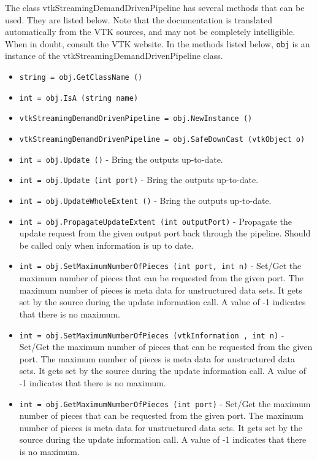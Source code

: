 The class vtkStreamingDemandDrivenPipeline has several methods that can be used.
  They are listed below.
Note that the documentation is translated automatically from the VTK sources,
and may not be completely intelligible.  When in doubt, consult the VTK website.
In the methods listed below, \verb|obj| is an instance of the vtkStreamingDemandDrivenPipeline class.
\begin{itemize}
\item  \verb|string = obj.GetClassName ()|

\item  \verb|int = obj.IsA (string name)|

\item  \verb|vtkStreamingDemandDrivenPipeline = obj.NewInstance ()|

\item  \verb|vtkStreamingDemandDrivenPipeline = obj.SafeDownCast (vtkObject o)|

\item  \verb|int = obj.Update ()| -  Bring the outputs up-to-date.

\item  \verb|int = obj.Update (int port)| -  Bring the outputs up-to-date.

\item  \verb|int = obj.UpdateWholeExtent ()| -  Bring the outputs up-to-date.

\item  \verb|int = obj.PropagateUpdateExtent (int outputPort)| -  Propagate the update request from the given output port back
 through the pipeline.  Should be called only when information is
 up to date.

\item  \verb|int = obj.SetMaximumNumberOfPieces (int port, int n)| -  Set/Get the maximum number of pieces that can be requested from
 the given port.  The maximum number of pieces is meta data for
 unstructured data sets.  It gets set by the source during the
 update information call.  A value of -1 indicates that there is
 no maximum.

\item  \verb|int = obj.SetMaximumNumberOfPieces (vtkInformation , int n)| -  Set/Get the maximum number of pieces that can be requested from
 the given port.  The maximum number of pieces is meta data for
 unstructured data sets.  It gets set by the source during the
 update information call.  A value of -1 indicates that there is
 no maximum.

\item  \verb|int = obj.GetMaximumNumberOfPieces (int port)| -  Set/Get the maximum number of pieces that can be requested from
 the given port.  The maximum number of pieces is meta data for
 unstructured data sets.  It gets set by the source during the
 update information call.  A value of -1 indicates that there is
 no maximum.


\end{itemize}
